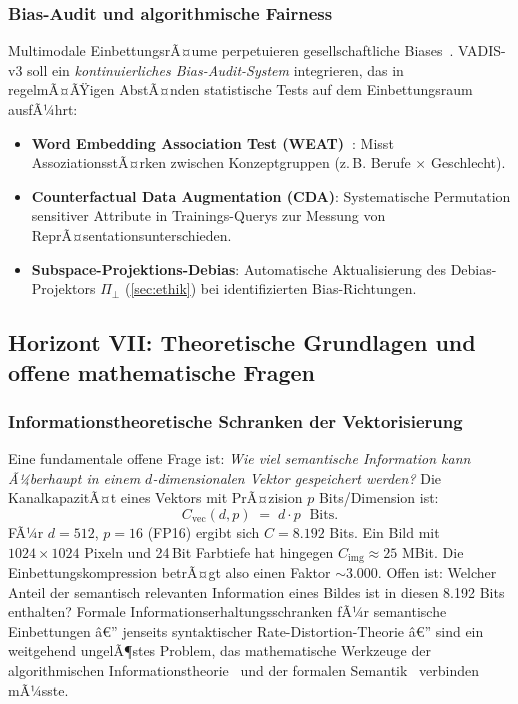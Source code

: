 ﻿\documentclass[12pt,a4paper]{article}
\begin{document}
\subsubsection{Bias-Audit und algorithmische Fairness}

Multimodale EinbettungsrÃ¤ume perpetuieren gesellschaftliche
Biases~\cite{bender2021stochastic}. VADIS-v3 soll ein
\emph{kontinuierliches Bias-Audit-System} integrieren,
das in regelmÃ¤ÃŸigen AbstÃ¤nden statistische Tests auf
dem Einbettungsraum ausfÃ¼hrt:

\begin{itemize}[leftmargin=1.2em, itemsep=2pt]
  \item \textbf{Word Embedding Association Test (WEAT)~\cite{caliskan2017semantics}}:
        Misst AssoziationsstÃ¤rken zwischen Konzeptgruppen
        (z.\,B. Berufe $\times$ Geschlecht).
  \item \textbf{Counterfactual Data Augmentation (CDA)}:
        Systematische Permutation sensitiver Attribute
        in Trainings-Querys zur Messung von
        ReprÃ¤\-sentationsunterschieden.
  \item \textbf{Subspace-Projektions-Debias}: Automatische
        Aktualisierung des Debias-Projektors $\Pi_\perp$
        (\cref{sec:ethik}) bei identifizierten Bias-Richtungen.
\end{itemize}

\subsection{Horizont VII: Theoretische Grundlagen und
            offene mathematische Fragen}
\label{sub:horizont7}

\subsubsection{Informationstheoretische Schranken der
              Vektorisierung}

Eine fundamentale offene Frage ist: \emph{Wie viel semantische
Information kann Ã¼berhaupt in einem $d$-dimensionalen Vektor
gespeichert werden?} Die KanalkapazitÃ¤t eines
Vektors mit PrÃ¤zision $p$ Bits/Dimension ist:
\begin{equation}
  C_{\text{vec}}(d, p) \;=\; d \cdot p \;\text{ Bits}.
\end{equation}
FÃ¼r $d = 512$, $p = 16$ (FP16) ergibt sich $C = 8.192$ Bits.
Ein Bild mit $1024 \times 1024$ Pixeln und 24\,Bit Farbtiefe
hat hingegen $C_{\text{img}} \approx 25$ MBit. Die
Einbettungskompression betrÃ¤gt also einen Faktor $\sim 3.000$.
Offen ist: Welcher Anteil der semantisch relevanten Information
eines Bildes ist in diesen 8.192 Bits enthalten?
Formale Informationserhaltungsschranken fÃ¼r semantische
Einbettungen â€” jenseits syntaktischer Rate-Distortion-Theorie â€”
sind ein weitgehend ungelÃ¶stes Problem, das
mathematische Werkzeuge der algorithmischen
Informationstheorie~\cite{kolmogorov1965threapproaches}
und der formalen Semantik~\cite{montague1973formal} verbinden mÃ¼sste.
\end{document}
